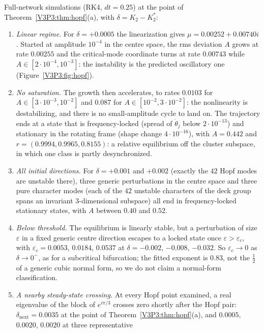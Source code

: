 \begin{remark}\label{V3P3:rem:hopfdyn}
Full-network simulations (RK4, $dt=0.25$) at the point of Theorem~\ref{V3P3:thm:hopf}(a), with
$\delta=K_2-K_2^{*}$:
\begin{enumerate}
\item[(1)] \emph{Linear regime.} For $\delta=+0.0005$ the linearization gives
$\mu=0.00252+0.00740i$. Started at amplitude $10^{-4}$ in the centre space, the rms deviation $A$
grows at rate $0.00255$ and the critical-mode coordinate turns at rate $0.00743$ while
$A\in[2\cdot10^{-4},10^{-3}]$: the instability is the predicted oscillatory one
(Figure~\ref{V3P3:fig:hopf}).
\item[(2)] \emph{No saturation.} The growth then accelerates, to rates $0.0103$ for
$A\in[3\cdot10^{-3},10^{-2}]$ and $0.087$ for $A\in[10^{-2},3\cdot10^{-2}]$: the nonlinearity is
destabilizing, and there is no small-amplitude cycle to land on. The trajectory ends at a state that
is frequency-locked (spread of $\dot\theta_j$ below $2\cdot10^{-13}$) and stationary in the rotating
frame (shape change $4\cdot10^{-16}$), with $A=0.442$ and $r=(0.9994,0.9965,0.8155)$: a relative
equilibrium off the cluster subspace, in which one class is partly desynchronized.
\item[(3)] \emph{All initial directions.} For $\delta=+0.001$ and $+0.002$ (exactly the $42$ Hopf
modes are unstable there), three generic perturbations in the centre space and three pure
character modes (each of the $42$ unstable characters of the deck group spans an invariant
$3$-dimensional subspace) all end in frequency-locked stationary states, with $A$ between $0.40$ and
$0.52$.
\item[(4)] \emph{Below threshold.} The equilibrium is linearly stable, but a perturbation of size
$\varepsilon$ in a fixed generic centre direction escapes to a locked state once
$\varepsilon>\varepsilon_c$, with $\varepsilon_c=0.0053$, $0.0184$, $0.0537$ at $\delta=-0.002$,
$-0.008$, $-0.032$. So $\varepsilon_c\to0$ as $\delta\to0^{-}$, as for a subcritical bifurcation; the
fitted exponent is $0.83$, not the $\frac12$ of a generic cubic normal form, so we do not claim a
normal-form classification.
\item[(5)] \emph{A nearby steady-state crossing.} At every Hopf point examined, a real eigenvalue of
the block of $e^{i\pi/3}$ crosses zero shortly after the Hopf pair: $\delta_{\mathrm{next}}=0.0035$ at
the point of Theorem~\ref{V3P3:thm:hopf}(a), and $0.0005$, $0.0020$, $0.0020$ at three representative

\end{enumerate}
\end{remark}
